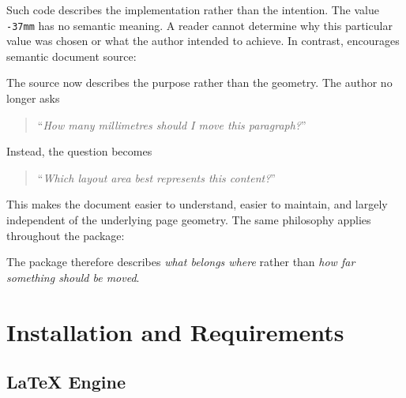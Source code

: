 \documentclass[
11pt,
a4paper,
oneside
]{scrbook}
\begin{document}



\begin{SynchronizedMarginAndTextArea}
	\begin{TextInMarginArea}
		{}
	\end{TextInMarginArea}
	\begin{TextInTextArea}
		Such code describes the implementation rather than the intention.
		The value \texttt{-37mm} has no semantic meaning.
		A reader cannot determine why this particular value was chosen or what the
		author intended to achieve.
		In contrast, \MDWordmark encourages semantic document source:




	\end{TextInTextArea}
\end{SynchronizedMarginAndTextArea}
The source now describes the purpose rather than the geometry.
The author no longer asks
\begin{quote}
	``\emph{How many millimetres should I move this paragraph?}''
\end{quote}
Instead, the question becomes
\begin{quote}
	``\emph{Which layout area best represents this content?}''
\end{quote}
This makes the document easier to understand, easier to maintain, and largely
independent of the underlying page geometry.
The same philosophy applies throughout the package:
\begin{center}
\end{center}
The package therefore describes \emph{what belongs where} rather than
\emph{how far something should be moved}.


\chapter{Installation and Requirements}
\label{chap:installation}
\begin{center}
\end{center}

\section{\LaTeX{} Engine}
\end{document}
